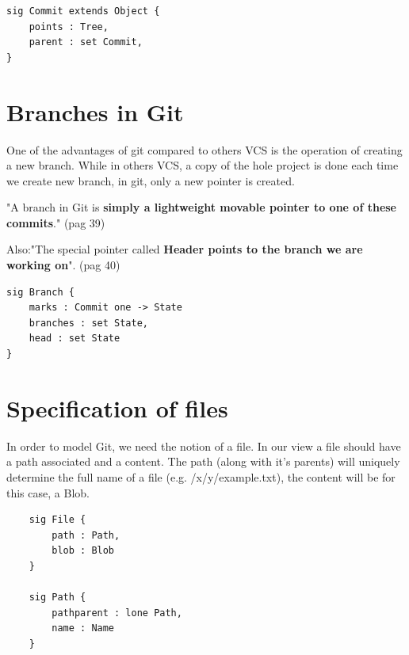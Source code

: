 \begin{lstlisting}
sig Commit extends Object {
	points : Tree,
	parent : set Commit,
}
\end{lstlisting}

\section{Branches in Git}
One of the advantages of git compared to others VCS is the operation
of creating a new branch. While in others VCS, a copy of the hole project is
done each time we create new branch, in git, only a new pointer is created.

"A branch in Git is {\bf simply a 
lightweight movable pointer to one of these commits}." \cite{progit} (pag 39) \par

Also:"The special pointer called {\bf Header 
points to the branch we are working on}". \cite{progit} (pag 40) \par

\begin{lstlisting}
sig Branch {
	marks : Commit one -> State
	branches : set State,
	head : set State
}
\end{lstlisting}

\section{Specification of files}

In order to model Git, we need the notion of a file. In our view a file should have
a path associated and a content. The path (along with it's parents)
will uniquely determine the full name of a file
(e.g. /x/y/example.txt), the content will be for this case, a Blob.

\begin{lstlisting}
	sig File {
		path : Path,
		blob : Blob
	}

	sig Path {
		pathparent : lone Path,
		name : Name
	}
\end{lstlisting}

